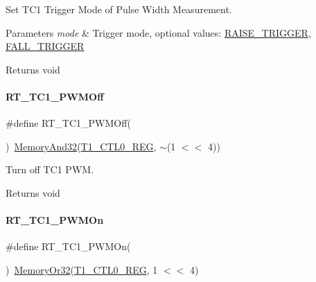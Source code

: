 Set T\+C1 Trigger Mode of Pulse Width Measurement. 


\begin{DoxyParams}{Parameters}
{\em mode} & Trigger mode, optional values\+: \mbox{\hyperlink{a00020_abda90eda34a640b130f48a6ade23fe22}{R\+A\+I\+S\+E\+\_\+\+T\+R\+I\+G\+G\+ER}}, \mbox{\hyperlink{a00020_a9bbaf5b9e2125c7597249c7113b20e6c}{F\+A\+L\+L\+\_\+\+T\+R\+I\+G\+G\+ER}} \\
\hline
\end{DoxyParams}
\begin{DoxyReturn}{Returns}
void 
\end{DoxyReturn}
\mbox{\label{a00044_afbffb90a80851e9a1e6e3dc03938c547}} 
\paragraph{\texorpdfstring{R\+T\+\_\+\+T\+C1\+\_\+\+P\+W\+M\+Off}{RT\_TC1\_PWMOff}}
{\footnotesize\ttfamily \#define R\+T\+\_\+\+T\+C1\+\_\+\+P\+W\+M\+Off(\begin{DoxyParamCaption}{ }\end{DoxyParamCaption})~\mbox{\hyperlink{a00020_ad87cedffcaadc51db22594fce55173d4}{Memory\+And32}}(\mbox{\hyperlink{a00020_adadaa0ab1ebbd7ba9b70dfd24c3ed44da38632250c2e72df96fcaa3f8bd8ecc5e}{T1\+\_\+\+C\+T\+L0\+\_\+\+R\+EG}}, $\sim$(1 $<$$<$ 4))}



Turn off T\+C1 P\+WM. 

\begin{DoxyReturn}{Returns}
void 
\end{DoxyReturn}
\mbox{\label{a00044_a66b006ccc7fcf8165e1bed013985b92e}} 
\paragraph{\texorpdfstring{R\+T\+\_\+\+T\+C1\+\_\+\+P\+W\+M\+On}{RT\_TC1\_PWMOn}}
{\footnotesize\ttfamily \#define R\+T\+\_\+\+T\+C1\+\_\+\+P\+W\+M\+On(\begin{DoxyParamCaption}{ }\end{DoxyParamCaption})~\mbox{\hyperlink{a00020_a27874a97deab7cecdde5ddecf466e31e}{Memory\+Or32}}(\mbox{\hyperlink{a00020_adadaa0ab1ebbd7ba9b70dfd24c3ed44da38632250c2e72df96fcaa3f8bd8ecc5e}{T1\+\_\+\+C\+T\+L0\+\_\+\+R\+EG}}, 1 $<$$<$ 4)}



